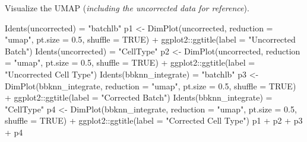 \documentclass[
]{book}
\newenvironment{Shaded}{\begin{snugshade}}{\end{snugshade}}
\newcommand{\AttributeTok}[1]{\textcolor[rgb]{0.77,0.63,0.00}{#1}}
\newcommand{\ConstantTok}[1]{\textcolor[rgb]{0.00,0.00,0.00}{#1}}
\newcommand{\FloatTok}[1]{\textcolor[rgb]{0.00,0.00,0.81}{#1}}
\newcommand{\FunctionTok}[1]{\textcolor[rgb]{0.00,0.00,0.00}{#1}}
\newcommand{\NormalTok}[1]{#1}
\newcommand{\OtherTok}[1]{\textcolor[rgb]{0.56,0.35,0.01}{#1}}
\newcommand{\SpecialCharTok}[1]{\textcolor[rgb]{0.00,0.00,0.00}{#1}}
\newcommand{\StringTok}[1]{\textcolor[rgb]{0.31,0.60,0.02}{#1}}
\begin{document}
Visualize the UMAP (\emph{including the uncorrected data for reference}).

\begin{Shaded}
\begin{Highlighting}[]
\FunctionTok{Idents}\NormalTok{(uncorrected) }\OtherTok{=} \StringTok{"batchlb"}
\NormalTok{p1 }\OtherTok{\textless{}{-}} \FunctionTok{DimPlot}\NormalTok{(uncorrected, }\AttributeTok{reduction =} \StringTok{"umap"}\NormalTok{, }\AttributeTok{pt.size =} \FloatTok{0.5}\NormalTok{, }\AttributeTok{shuffle =} \ConstantTok{TRUE}\NormalTok{) }\SpecialCharTok{+}\NormalTok{ ggplot2}\SpecialCharTok{::}\FunctionTok{ggtitle}\NormalTok{(}\AttributeTok{label =} \StringTok{"Uncorrected Batch"}\NormalTok{)}
\FunctionTok{Idents}\NormalTok{(uncorrected) }\OtherTok{=} \StringTok{"CellType"}
\NormalTok{p2 }\OtherTok{\textless{}{-}} \FunctionTok{DimPlot}\NormalTok{(uncorrected, }\AttributeTok{reduction =} \StringTok{"umap"}\NormalTok{, }\AttributeTok{pt.size =} \FloatTok{0.5}\NormalTok{, }\AttributeTok{shuffle =} \ConstantTok{TRUE}\NormalTok{) }\SpecialCharTok{+}\NormalTok{ ggplot2}\SpecialCharTok{::}\FunctionTok{ggtitle}\NormalTok{(}\AttributeTok{label =} \StringTok{"Uncorrected Cell Type"}\NormalTok{)}
\FunctionTok{Idents}\NormalTok{(bbknn\_integrate) }\OtherTok{=} \StringTok{"batchlb"}
\NormalTok{p3 }\OtherTok{\textless{}{-}} \FunctionTok{DimPlot}\NormalTok{(bbknn\_integrate, }\AttributeTok{reduction =} \StringTok{"umap"}\NormalTok{, }\AttributeTok{pt.size =} \FloatTok{0.5}\NormalTok{, }\AttributeTok{shuffle =} \ConstantTok{TRUE}\NormalTok{) }\SpecialCharTok{+}\NormalTok{ ggplot2}\SpecialCharTok{::}\FunctionTok{ggtitle}\NormalTok{(}\AttributeTok{label =} \StringTok{"Corrected Batch"}\NormalTok{)}
\FunctionTok{Idents}\NormalTok{(bbknn\_integrate) }\OtherTok{=} \StringTok{"CellType"}
\NormalTok{p4 }\OtherTok{\textless{}{-}} \FunctionTok{DimPlot}\NormalTok{(bbknn\_integrate, }\AttributeTok{reduction =} \StringTok{"umap"}\NormalTok{, }\AttributeTok{pt.size =} \FloatTok{0.5}\NormalTok{, }\AttributeTok{shuffle =} \ConstantTok{TRUE}\NormalTok{) }\SpecialCharTok{+}\NormalTok{ ggplot2}\SpecialCharTok{::}\FunctionTok{ggtitle}\NormalTok{(}\AttributeTok{label =} \StringTok{"Corrected Cell Type"}\NormalTok{)}
\NormalTok{p1 }\SpecialCharTok{+}\NormalTok{ p2 }\SpecialCharTok{+}\NormalTok{ p3 }\SpecialCharTok{+}\NormalTok{ p4}
\end{Highlighting}
\end{Shaded}
\end{document}
